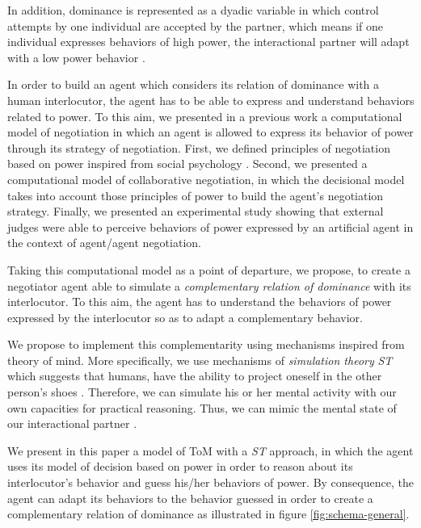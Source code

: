 \documentclass[sigconf]{aamas}  %
\begin{document}
	In addition, dominance is represented as a dyadic variable in which control attempts by one individual are accepted by the partner, which means if one individual expresses behaviors of high power, the interactional partner will adapt with a low power behavior \cite{burgoon1998nature}. 
	
	
	In order to build an agent which considers its relation of dominance with a human interlocutor, the agent has to be able to express and understand behaviors related to power. To this aim, we presented in a previous work \cite{ouali2017computational} a computational model of negotiation in which an agent is allowed to express its behavior of power through its strategy of negotiation. First, we defined principles of negotiation based on power inspired from social psychology \cite{de1995impact,van2004interpersonal,van2006power,magee2007power}. Second, we presented a computational model of collaborative negotiation, in which the decisional model takes into account those principles of power to build the agent's negotiation strategy. 
	Finally, we presented an experimental study showing that external judges were able to perceive behaviors of power expressed by an artificial agent in the context of agent/agent negotiation.
	
	
	Taking this computational model as a point of departure, we propose, to create a negotiator agent able to simulate a \emph{complementary relation of dominance} with its interlocutor. To this aim, the agent has to understand the behaviors of power expressed by the interlocutor so as to adapt a complementary behavior.

	We propose to implement this complementarity using mechanisms inspired from theory of mind. More specifically, we use mechanisms of \emph{simulation theory} \emph{ST} which suggests that humans, have the ability to project oneself in the other person's shoes \cite{shanton2010simulation}. Therefore, we can simulate his or her mental activity with our own capacities for practical reasoning. 
	Thus, we can mimic the mental state of our interactional partner \cite{harbers2009modeling}.
	
	We present in this paper a model of ToM with a \emph{ST} approach, in which the agent uses its model of decision based on power in order to reason about its interlocutor's behavior and guess his/her behaviors of power. By consequence, the agent can adapt its behaviors to the behavior guessed in order to create a complementary relation of dominance as illustrated in figure \ref{fig:schema-general}.
	
\end{document}

